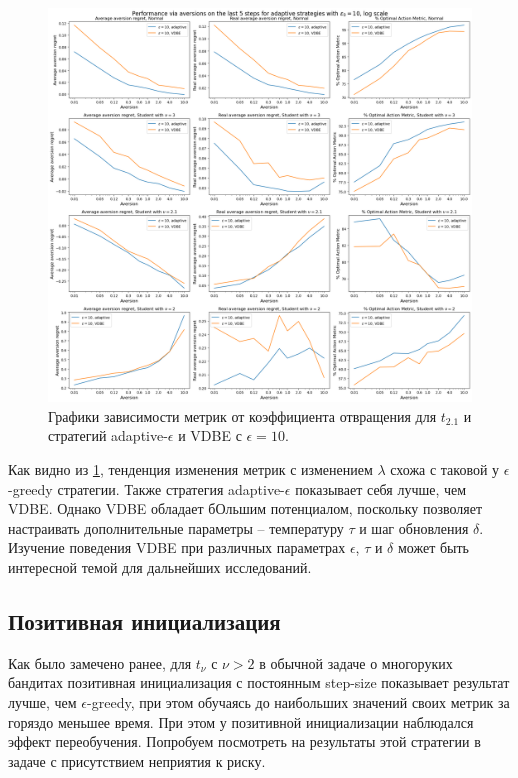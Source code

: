 \documentclass{article}
\begin{document}
\begin{figure}[ht!] %
\centering
\includegraphics[width=6in]{theory_tester/theory_images/adaptive_epsilon/aversion_last_5_steps.png}
\caption{Графики зависимости метрик от коэффициента отвращения для $t_{2.1}$ и стратегий adaptive-$\epsilon$ и VDBE с $\epsilon=10$.}
\label{fig:adaptive_eps_last_5_steps}
\end{figure}

Как видно из \ref{fig:adaptive_eps_last_5_steps}, тенденция изменения метрик с изменением $\lambda$ схожа с таковой у $\epsilon$-greedy стратегии. Также стратегия adaptive-$\epsilon$ показывает себя лучше, чем VDBE. Однако VDBE обладает бОльшим потенциалом, поскольку позволяет настраивать дополнительные параметры -- температуру $\tau$ и шаг обновления $\delta$. Изучение поведения VDBE при различных параметрах $\epsilon$, $\tau$ и $\delta$ может быть интересной темой для дальнейших исследований.

\subsection{Позитивная инициализация}

Как было замечено ранее, для $t_{\nu}$ с $\nu > 2$ в обычной задаче о многоруких бандитах позитивная инициализация с постоянным step-size показывает результат лучше, чем $\epsilon$-greedy, при этом обучаясь до наибольших значений своих метрик за горяздо меньшее время. При этом у позитивной инициализации наблюдался эффект переобучения. Попробуем посмотреть на результаты этой стратегии в задаче с присутствием неприятия к риску.
\end{document}
